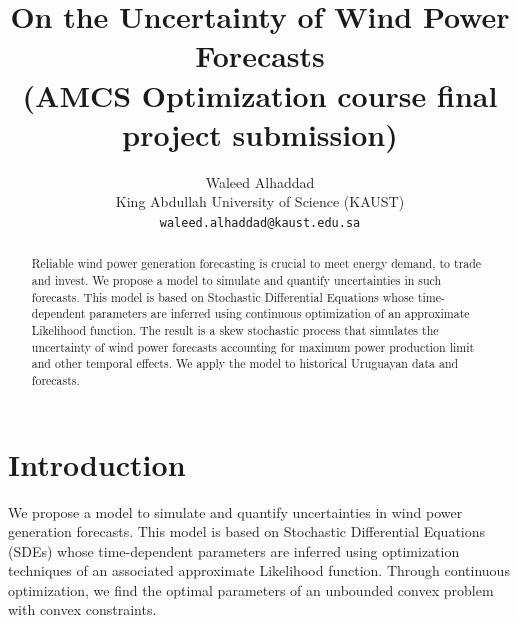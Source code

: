 \documentclass[10pt,twocolumn,letterpaper]{article}
\begin{document}
\title{ On the Uncertainty of Wind Power Forecasts \\  \small{(AMCS Optimization course final project submission)}}

\author{Waleed  Alhaddad\\
King Abdullah University of Science (KAUST)\\
{\tt\small waleed.alhaddad@kaust.edu.sa}
\and
}

\maketitle


\begin{abstract}
Reliable wind power generation forecasting is crucial to meet energy demand, to trade and invest. We propose a model to simulate and quantify uncertainties in such forecasts. This model is based on Stochastic Differential Equations whose time-dependent parameters are inferred using continuous optimization of an approximate Likelihood function. The result is a skew stochastic process that simulates the uncertainty of wind power forecasts accounting for maximum power production limit and other temporal effects. We apply the model to historical Uruguayan data and forecasts.
\end{abstract}

\section{Introduction}

    We propose a model to simulate and quantify uncertainties in wind power generation forecasts. This model is based on Stochastic Differential Equations (SDEs) whose time-dependent parameters are inferred using optimization techniques of an associated approximate Likelihood function. Through continuous optimization, we find the optimal parameters of an unbounded convex problem with convex constraints.
\end{document}
